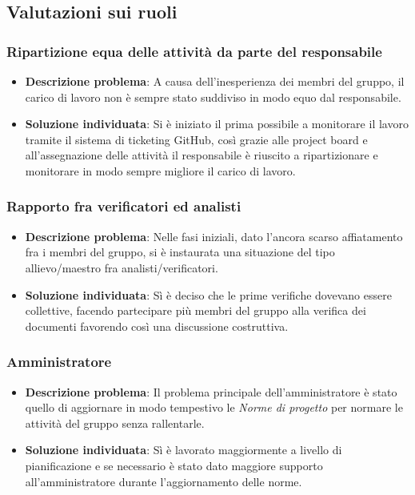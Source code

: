 \subsection{Valutazioni sui ruoli}
	\subsubsection{Ripartizione equa delle attività da parte del responsabile}
	\begin{itemize}
		\item \textbf{Descrizione problema}: A causa dell'inesperienza dei membri del gruppo, il carico di lavoro non è sempre stato suddiviso in modo equo dal responsabile.
		\item \textbf{Soluzione individuata}: Si è iniziato il prima possibile a monitorare il lavoro tramite il sistema di ticketing GitHub, così grazie alle project board e all'assegnazione delle attività il responsabile è riuscito a ripartizionare e monitorare in modo sempre migliore il carico di lavoro.
	\end{itemize}
	\subsubsection{Rapporto fra verificatori ed analisti}
		\begin{itemize}
			\item \textbf{Descrizione problema}: Nelle fasi iniziali, dato l'ancora scarso affiatamento fra i membri del gruppo, si è instaurata una situazione del tipo allievo/maestro fra analisti/verificatori.
			\item \textbf{Soluzione individuata}: Sì è deciso che le prime verifiche dovevano essere collettive, facendo partecipare più membri del gruppo alla verifica dei documenti favorendo così una discussione costruttiva.
		\end{itemize}
	\subsubsection{Amministratore}
		\begin{itemize}
			\item \textbf{Descrizione problema}: Il problema principale dell'amministratore è stato quello di aggiornare in modo tempestivo le \textit{Norme di progetto} per normare le attività del gruppo senza rallentarle.
			\item \textbf{Soluzione individuata}: Sì è lavorato maggiormente a livello di pianificazione e se necessario è stato dato maggiore supporto all'amministratore durante l'aggiornamento delle norme.
		\end{itemize}
